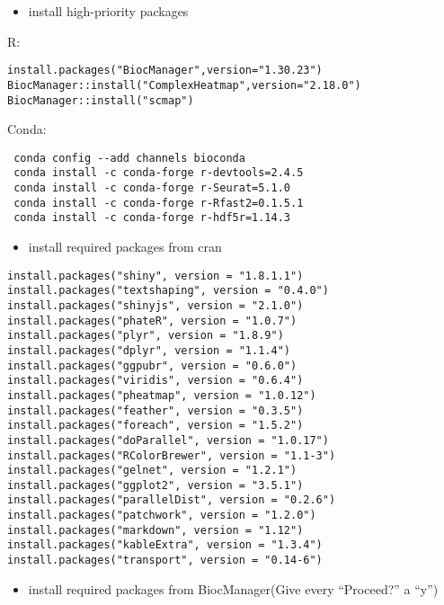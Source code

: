 \documentclass[
]{book}
\providecommand{\tightlist}{%
  \setlength{\itemsep}{0pt}\setlength{\parskip}{0pt}}
\begin{document}
\begin{itemize}
\tightlist
\item
  install high-priority packages
\end{itemize}

R:

\begin{verbatim}
install.packages("BiocManager",version="1.30.23")
BiocManager::install("ComplexHeatmap",version="2.18.0")     
BiocManager::install("scmap")
\end{verbatim}

Conda:

\begin{verbatim}
 conda config --add channels bioconda
 conda install -c conda-forge r-devtools=2.4.5      
 conda install -c conda-forge r-Seurat=5.1.0        
 conda install -c conda-forge r-Rfast2=0.1.5.1      
 conda install -c conda-forge r-hdf5r=1.14.3
\end{verbatim}

\begin{itemize}
\tightlist
\item
  install required packages from cran
\end{itemize}

\begin{verbatim}
install.packages("shiny", version = "1.8.1.1")
install.packages("textshaping", version = "0.4.0")
install.packages("shinyjs", version = "2.1.0")
install.packages("phateR", version = "1.0.7")
install.packages("plyr", version = "1.8.9")
install.packages("dplyr", version = "1.1.4")
install.packages("ggpubr", version = "0.6.0")
install.packages("viridis", version = "0.6.4")
install.packages("pheatmap", version = "1.0.12")
install.packages("feather", version = "0.3.5")
install.packages("foreach", version = "1.5.2")
install.packages("doParallel", version = "1.0.17")
install.packages("RColorBrewer", version = "1.1-3")
install.packages("gelnet", version = "1.2.1")
install.packages("ggplot2", version = "3.5.1")
install.packages("parallelDist", version = "0.2.6")
install.packages("patchwork", version = "1.2.0")
install.packages("markdown", version = "1.12")
install.packages("kableExtra", version = "1.3.4")
install.packages("transport", version = "0.14-6")
\end{verbatim}

\begin{itemize}
\tightlist
\item
  install required packages from BiocManager(Give every ``Proceed?'' a
  ``y'')
\end{itemize}
\end{document}
